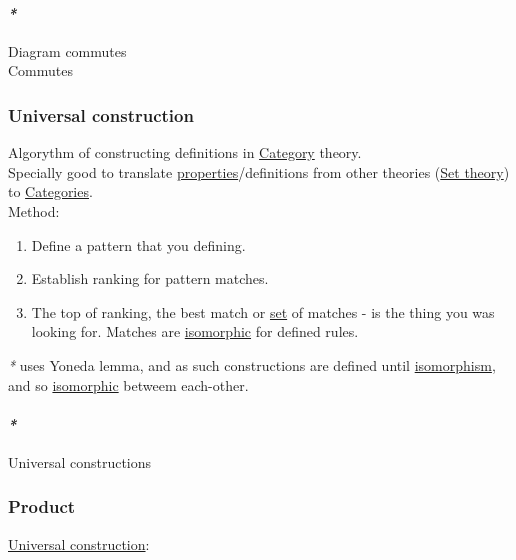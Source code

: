 \documentclass[11pt]{article}
\begin{document}
\paragraph{\emph{*}}
\label{sec:orgb278176}

\label{org7950297}Diagram commutes\\
\label{orgb480131}Commutes\\

\subsubsection{\label{orga62387d}Universal construction}
\label{sec:org47d325a}
Algorythm of constructing definitions in \hyperref[org3e3a79b]{Category} theory.\\
Specially good to translate \hyperref[org763ad6b]{properties}/definitions from other theories (\hyperref[org3257163]{Set theory}) to \hyperref[org43ea200]{Categories}.\\

Method:\\
\begin{enumerate}
\item Define a pattern that you defining.\\
\item Establish ranking for pattern matches.\\
\item The top of ranking, the best match or \hyperref[orgbed80ba]{set} of matches - is the thing you was looking for. Matches are \hyperref[org6d62cf4]{isomorphic} for defined rules.\\
\end{enumerate}

\emph{*} uses Yoneda lemma, and as such constructions are defined until \hyperref[org3db0474]{isomorphism}, and so \hyperref[org6d62cf4]{isomorphic} betweem each-other.\\

\paragraph{\emph{*}}
\label{sec:orge043093}

\label{orgeb0c72b}Universal constructions\\

\subsubsection{\label{orga3d1454}Product}
\label{sec:org520e0e3}
\hyperref[orga62387d]{Universal construction}:\\
\end{document}
